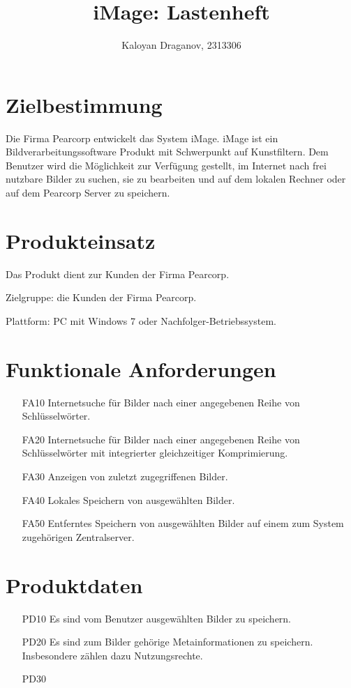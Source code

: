 \documentclass[parskip=full]{scrartcl}
\title{iMage: Lastenheft}
\author{Kaloyan Draganov, 2313306}
\begin{document}
\maketitle

\section{Zielbestimmung}
Die Firma Pearcorp entwickelt das System iMage. iMage ist ein Bildverarbeitungssoftware Produkt mit Schwerpunkt auf \gls{Kunstfiltern}. Dem \gls{Benutzer} wird die Möglichkeit zur Verfügung gestellt, im Internet nach frei nutzbare Bilder zu suchen, sie zu bearbeiten und auf dem lokalen \gls{Rechner} oder auf dem Pearcorp \gls{Server} zu speichern.

\section{Produkteinsatz}
Das Produkt dient zur Kunden der Firma Pearcorp.

Zielgruppe: die Kunden der Firma Pearcorp.

Plattform: PC mit Windows 7 oder Nachfolger-Betriebssystem.

\section{Funktionale Anforderungen}
\begin{itemize}[nosep]
\item[FA10] Internetsuche für Bilder nach einer angegebenen Reihe von Schlüsselwörter.
\item[FA20] Internetsuche für Bilder nach einer angegebenen Reihe von Schlüsselwörter mit integrierter gleichzeitiger Komprimierung.
\item[FA30] Anzeigen von zuletzt zugegriffenen Bilder.
\item[FA40] Lokales Speichern von ausgewählten Bilder.
\item[FA50] Entferntes Speichern von ausgewählten Bilder auf einem zum System zugehörigen Zentralserver.
\end{itemize}

\section{Produktdaten}
\begin{itemize}[nosep]
\item[PD10] Es sind vom Benutzer ausgewählten Bilder zu speichern.
\item[PD20] Es sind zum Bilder gehörige \gls{Metainformationen} zu speichern. Insbesondere zählen dazu Nutzungsrechte.
\item[PD30] 
\end{itemize}
\end{document}
